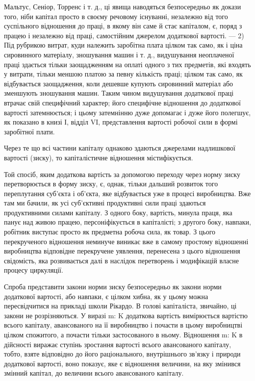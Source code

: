 \parcont{}  %
Мальтус, Сеніор, Торренс і т. д., ці явища наводяться безпосередньо
як докази того, ніби капітал просто в своєму речовому
існуванні, незалежно від того суспільного відношення до
праці, в якому він саме й стає капіталом, є, поряд з працею
і незалежно від праці, самостійним джерелом додаткової вартості.
— 2) Під рубрикою витрат, куди належить заробітна плата
цілком так само, як і ціна сировинного матеріалу, зношування
машин і т. д., видушування неоплаченої праці здається тільки
заощадженням на оплаті одного з тих предметів, які входять
у витрати, тільки меншою платою за певну кількість праці;
цілком так само, як відбувається заощадження, коли дешевше
купують сировинний матеріал або зменшують зношування машин.
Таким чином видушування додаткової праці втрачає свій
специфічний характер; його специфічне відношення до додаткової
вартості затемнюється; і цьому затемнінню дуже допомагає
і дуже його полегшує, як показано в книзі І, відділ VI,
представлення вартості робочої сили в формі заробітної плати.

Через те що всі частини капіталу однаково здаються джерелами
надлишкової вартості (зиску), то капіталістичне відношення
містифікується.

Той спосіб, яким додаткова вартість за допомогою переходу
через норму зиску перетворюється в форму зиску, є, однак,
тільки дальший розвиток того переплутання суб’єкта і об’єкта,
яке відбувається уже в процесі виробництва. Вже там ми бачили,
як усі суб’єктивні продуктивні сили праці здаються продуктивними
силами капіталу. З одного боку, вартість, минула праця,
яка панує над живою працею, персоніфікується в капіталісті;
з другого боку, навпаки, робітник виступає просто як предметна
робоча сила, як товар. З цього перекрученого відношення неминуче
виникає вже в самому простому відношенні виробництва
відповідне перекручене уявлення, перенесена з цього відношення
свідомість, яка розвивається далі в наслідок перетворень і модифікацій
власне процесу циркуляції.

Спроба представити закони норми зиску безпосередньо як закони
норми додаткової вартості, або навпаки, є цілком хибна, як
у цьому можна пересвідчитися на прикладі школи Рікардо. В голові
капіталіста, звичайно, ці закони не розрізняються. У виразі m: K
додаткова вартість вимірюється вартістю всього капіталу, авансованого
на її виробництво і почасти в цьому виробництві цілком спожитого,
а почасти тільки застосованого в ньому. Відношення m: K в
дійсності виражає ступінь зростання вартості всього авансованого
капіталу, тобто, взяте відповідно до його раціонального, внутрішнього
зв’язку і природи додаткової вартості, воно показує,
яке є відношення величини, на яку змінився змінний капітал, до
величини всього авансованого капіталу.
